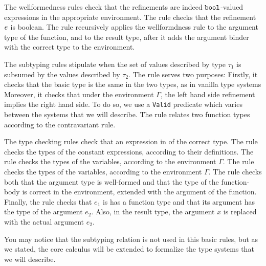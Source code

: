 The wellformedness rules check that the 
refinements are indeed $\texttt{bool}$-valued expressions in the 
appropriate environment.
The rule \wtBase checks that the  
refinement $e$ is boolean.
The rule \wtFun recursively applies the wellformdness rule to
the argument type of the function, and to the result type, 
after it adds the argument binder with the correct type to 
the environment.

The subtyping rules stipulate when the set of values described 
by type $\tau_1$ is subsumed by the values described by $\tau_2$.
%
The rule \tsubBase serves two purposes:
Firstly,
it checks that the basic type is the same in the two types, 
as in vanilla type systems
Moreover, it checks that under the environment $\Gamma$, 
the left hand side refinement implies the right hand side.
To do so, we use a \texttt{Valid} predicate which varies between the systems that we will describe.
%
The rule \tsubFun relates two function types according to the contravariant rule.

The type checking rules check that an expression in of the correct type.
The rule \tconst checks the types of the constant expressions, according 
to their definitions.
The rule \tvar checks the types of the variables, according 
to the environment $\Gamma$.
The rule \tfun checks the types of the variables, according 
to the environment $\Gamma$.
The rule \tfunction checks both that the argument type is well-formed 
and that the type of the function-body
is correct in the environment, extended with the argument of the function.
Finally, the rule \tapp checks that $e_1$ is has a function type
and that its argument has the type of the argument $e_2$.
Also, in the result type, the argument $x$ is replaced with the actual argument $e_2$.

You may notice that the subtyping relation 
is not used in this basic rules,
but as we stated, the core calculus will be extended to formalize the
type systems that we will describe.

